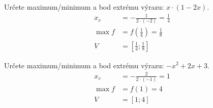 \documentclass[11pt,a4paper]{article}
\begin{document}
\begin{zadaniReseniBox}[title={Rozšíření 1}]
Určete maximum/minimum a bod extrému výrazu: $x \cdot \left(1 - 2x\right)$.
\tcblower
\[
\begin{aligned}x_v&=-\frac{1}{2\cdot(-2)}=\frac{1}{4}\\\max f&=f(\frac{1}{4})=\frac{1}{8}\\V&=[\frac{1}{4};\frac{1}{8}]\end{aligned}
\]
\end{zadaniReseniBox}

\begin{zadaniReseniBox}[title={Rozšíření 2}]
Určete maximum/minimum a bod extrému výrazu: $- x^{2} + 2x + 3$.
\tcblower
\[
\begin{aligned}x_v&=-\frac{2}{2\cdot(-1)}=1\\\max f&=f(1)=4\\V&=[1;4]\end{aligned}
\]
\end{zadaniReseniBox}
\end{document}
